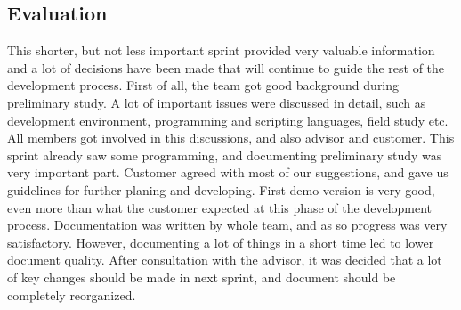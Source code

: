 \subsection{Evaluation}
	This shorter, but not less important sprint provided very valuable information and a lot of decisions have been made that will continue to guide the rest of the development process. First of all, the team got good background during preliminary study. A lot of important issues were discussed in detail, such as development environment, programming and scripting languages, field study etc. All members got involved in this discussions, and also advisor and customer. This sprint already saw some programming, and documenting preliminary study was very important part.\newline
	Customer agreed with most of our suggestions, and gave us guidelines for further planing and developing. First demo version is very good, even more than what the customer expected at this phase of the development process.\newline
	Documentation was written by whole team, and as so progress was very satisfactory. However, documenting a lot of things in a short time led to lower document quality. After consultation with the advisor, it was decided that a lot of key changes should be made in next sprint, and document should be completely reorganized.
